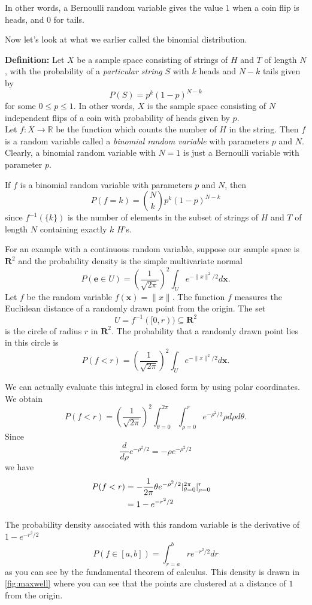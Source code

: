 \documentclass[
]{article}
\begin{document}
In other words, a Bernoulli random variable gives the value \(1\) when a
coin flip is heads, and \(0\) for tails.

Now let's look at what we earlier called the binomial distribution.

\textbf{Definition:} Let \(X\) be a sample space consisting of strings
of \(H\) and \(T\) of length \(N\), with the probability of a
\emph{particular string} \(S\) with \(k\) heads and \(N-k\) tails given
by \[
P(S)=p^{k}(1-p)^{N-k}
\] for some \(0\le p\le 1\). In other words, \(X\) is the sample space
consisting of \(N\) independent flips of a coin with probability of
heads given by \(p\).\\
Let \(f:X\to \mathbb{R}\) be the function which counts the number of
\(H\) in the string. Then \(f\) is a random variable called a
\emph{binomial random variable} with parameters \(p\) and \(N\).
Clearly, a binomial random variable with \(N=1\) is just a Bernoulli
variable with parameter \(p\).

If \(f\) is a binomial random variable with parameters \(p\) and \(N\),
then \[
P(f=k) = \binom{N}{k}p^{k}(1-p)^{N-k}
\] since \(f^{-1}(\{k\})\) is the number of elements in the subset of
strings of \(H\) and \(T\) of length \(N\) containing exactly \(k\)
\(H\)'s.

For an example with a continuous random variable, suppose our sample
space is \(\mathbf{R}^{2}\) and the probability density is the simple
multivariate normal \[
P(\mathbf{e}\in U) = \left(\frac{1}{\sqrt{2\pi}}\right)^2\int_{U} e^{-\|x\|^2/2} d\mathbf{x}.
\] Let \(f\) be the random variable \(f(\mathbf{x})=\|x\|\). The
function \(f\) measures the Euclidean distance of a randomly drawn point
from the origin. The set \[U=f^{-1}([0,r))\subseteq\mathbf{R}^{2}\] is
the circle of radius \(r\) in \(\mathbf{R}^{2}\). The probability that a
randomly drawn point lies in this circle is \[
P(f<r) = \left(\frac{1}{\sqrt{2\pi}}\right)^2\int_{U} e^{-\|x\|^2/2} d\mathbf{x}.
\]

We can actually evaluate this integral in closed form by using polar
coordinates. We obtain \[
P(f<r) = \left(\frac{1}{\sqrt{2\pi}}\right)^2\int_{\theta=0}^{2\pi}\int_{\rho=0}^{r} e^{-\rho^2/2}\rho d\rho d\theta.
\] Since \[
\frac{d}{d\rho}e^{-\rho^2/2}=-\rho e^{-\rho^2/2}
\] we have \begin{align*}
P(f<r)&=-\frac{1}{2\pi}\theta e^{-\rho^2/2}|_{\theta=0}^{2\pi}|_{\rho=0}^{r}\cr
&=1-e^{-r^2/2}\cr
\end{align*}

The probability density associated with this random variable is the
derivative of \(1-e^{-r^2/2}\) \[
P(f\in [a,b])=\int_{r=a}^{b} re^{-r^2/2} dr
\] as you can see by the fundamental theorem of calculus. This density
is drawn in \cref{fig:maxwell} where you can see that the points are
clustered at a distance of \(1\) from the origin.
\end{document}
